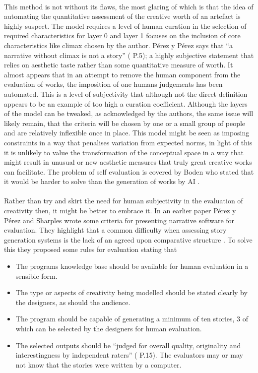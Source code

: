 \documentclass[letterpaper]{article}
\begin{document}
\\This method is not without its flaws, the most glaring of which is that the idea of automating the quantitative assessment of the creative worth of an artefact is highly suspect. The model requires a level of human curation in the selection of required characteristics for layer 0 and layer 1 focuses on the inclusion of core characteristics like climax chosen by the author. P\'erez y P\'erez says that \enquote{a narrative without climax is not a story} (\citeauthor{y2014three} \citeyear{y2014three} P.5); a highly subjective statement that relies on aesthetic taste rather than some quantitative measure of worth. It almost appears that in an attempt to remove the human component from the evaluation of works, the imposition of one humans judgements has been automated. This is a level of subjectivity that although not the direct definition appears to be an example of too high a curation coefficient. Although the layers of the model can be tweaked, as acknowledged by the authors, the same issue will likely remain, that the criteria will be chosen by one or a small group of people and are relatively inflexible once in place. This model might be seen as imposing constraints in a way that penalises variation from expected norms, in light of this it is unlikely to value the transformation of the conceptual space in a way that might result in unusual or new aesthetic measures that truly great creative works can facilitate. The problem of self evaluation is covered by Boden who stated that it would be harder to solve than the generation of works by AI \cite{BODEN1998347}.\\
\\Rather than try and skirt the need for human subjectivity in the evaluation of creativity then, it might be better to embrace it. In an earlier paper P\'erez y P\'erez and Sharples wrote some criteria for presenting narrative software for evaluation. They highlight that a common difficulty when assessing story generation systems is the lack of an agreed upon comparative structure \cite{PEREZYPEREZ200415}. To solve this they proposed some rules for evaluation stating that
\begin{itemize}
\item The programs knowledge base should be available for human evaluation in a sensible form.
\item The type or aspects of creativity being modelled should be stated clearly by the designers, as should the audience.
\item The program should be capable of generating a minimum of ten stories, 3 of which can be selected by the designers for human evaluation.
\item The selected outputs should be \enquote{judged for overall quality, originality and interestingness by independent raters} (\citeauthor{PEREZYPEREZ200415} \citeyear{PEREZYPEREZ200415} P.15). The evaluators may or may not know that the stories were written by a computer.
\end{itemize}
\end{document}
